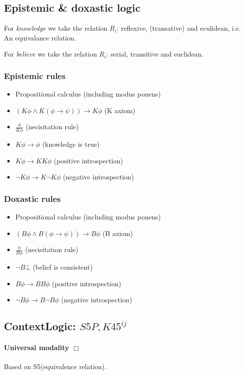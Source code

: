 \documentclass{article}
\begin{document}
\subsection{Epistemic \& doxastic logic}
For \emph{knowledge} we take the relation $R_i$: reflexive, (transative) and
eculidean, i.e. An equivalance relation.

For \emph{believe} we take the relation $R_i$: serial, transitive and 
euclidean.

\subsubsection{Epistemic rules}
\begin{itemize}
	\item Propositional calculus (including modus ponens)
	\item $(K\phi \wedge K(\phi \to \psi)) \to K \phi$ (K axiom)
	\item $\frac{\phi}{K\phi}$ (necisitation rule)
	\item $K \phi \to \phi$ (knowledge is true)
	\item $K \phi \to KK\phi$ (positive introspection)
	\item $\neg K \phi \to K\neg K\phi$ (negative introspection)
\end{itemize}

\subsubsection{Doxastic rules}
\begin{itemize}
	\item Propositional calculus (including modus ponens)
	\item $(B\phi \wedge B(\phi \to \psi)) \to B \phi$ (B axiom)
	\item $\frac{\phi}{B\phi}$ (necisitation rule)
	\item $\neg B \bot$ (belief is consistent)
	\item $B \phi \to BB\phi$ (positive introspection)
	\item $\neg B \phi \to B\neg B\phi$ (negative introspection)
\end{itemize}

\subsection{ContextLogic: $S5P,K45^{ij}$}

\paragraph{Universal modality $\Box$} Based on S5(equivalence relation).
\end{document}

